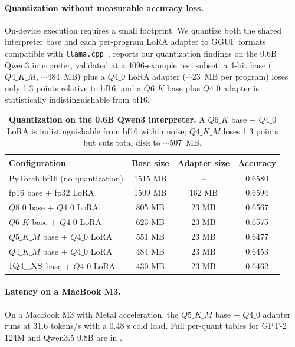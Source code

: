 \documentclass{article}
\theoremstyle{plain}
\theoremstyle{definition}
\theoremstyle{remark}
\begin{document}
\paragraph{Quantization without measurable accuracy loss.}
On-device execution requires a small footprint. We quantize both the shared interpreter base and each per-program LoRA adapter to GGUF formats compatible with \texttt{llama.cpp}~\citep{llamacpp}.  reports our quantization findings on the 0.6B Qwen3 interpreter, validated at a 4096-example test subset: a 4-bit base ($Q4\_K\_M$, $\sim$484~MB) plus a $Q4\_0$ LoRA adapter ($\sim$23~MB per program) loses only 1.3 points relative to bf16, and a $Q6\_K$ base plus $Q4\_0$ adapter is statistically indistinguishable from bf16. 


\begin{table}[!t]
\centering
\caption{\label{tab:quant_main}\textbf{Quantization on the 0.6B Qwen3 interpreter.} A $Q6\_K$ base + $Q4\_0$ LoRA is indistinguishable from bf16 within noise; $Q4\_K\_M$ loses 1.3 points but cuts total disk to $\sim$507~MB.}
\small
\setlength{\tabcolsep}{6pt}
\begin{tabular}{@{}lccc@{}}
\toprule
Configuration & Base size & Adapter size & Accuracy \\
\midrule
PyTorch bf16 (no quantization)        & 1515 MB & --   & 0.6580 \\
fp16 base + fp32 LoRA                 & 1509 MB & 162 MB & 0.6594 \\
$Q8\_0$ base + $Q4\_0$ LoRA           &  805 MB &  23 MB & 0.6567 \\
$Q6\_K$ base + $Q4\_0$ LoRA           &  623 MB &  23 MB & 0.6575 \\
$Q5\_K\_M$ base + $Q4\_0$ LoRA        &  551 MB &  23 MB & 0.6477 \\
$Q4\_K\_M$ base + $Q4\_0$ LoRA        &  484 MB &  23 MB & 0.6453 \\
$\textsc{IQ4\_XS}$ base + $Q4\_0$ LoRA &  430 MB &  23 MB & 0.6462 \\
\bottomrule
\end{tabular}
\end{table}

\paragraph{Latency on a MacBook M3.}
On a MacBook M3 with Metal acceleration, the $Q5\_K\_M$ base + $Q4\_0$ adapter runs at 31.6 tokens/s with a 0.48 s cold load. Full per-quant tables for GPT-2 124M and Qwen3.5 0.8B are in .
\end{document}
